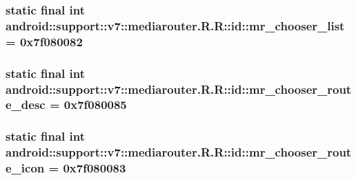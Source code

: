 \hypertarget{classandroid_1_1support_1_1v7_1_1mediarouter_1_1_r_1_1id_77f6fa752dac8bb5734bb79c7aaa6a78}{
\subsubsection[{mr\_\-chooser\_\-list}]{\setlength{\rightskip}{0pt plus 5cm}static final int android::support::v7::mediarouter.R.R::id::mr\_\-chooser\_\-list = 0x7f080082}}
\label{classandroid_1_1support_1_1v7_1_1mediarouter_1_1_r_1_1id_77f6fa752dac8bb5734bb79c7aaa6a78}


\hypertarget{classandroid_1_1support_1_1v7_1_1mediarouter_1_1_r_1_1id_fd0dd5da1b53994a128bd617d711ae46}{
\subsubsection[{mr\_\-chooser\_\-route\_\-desc}]{\setlength{\rightskip}{0pt plus 5cm}static final int android::support::v7::mediarouter.R.R::id::mr\_\-chooser\_\-route\_\-desc = 0x7f080085}}
\label{classandroid_1_1support_1_1v7_1_1mediarouter_1_1_r_1_1id_fd0dd5da1b53994a128bd617d711ae46}


\hypertarget{classandroid_1_1support_1_1v7_1_1mediarouter_1_1_r_1_1id_847b8df29bf2aed513bddd8f388fd0ba}{
\subsubsection[{mr\_\-chooser\_\-route\_\-icon}]{\setlength{\rightskip}{0pt plus 5cm}static final int android::support::v7::mediarouter.R.R::id::mr\_\-chooser\_\-route\_\-icon = 0x7f080083}}
\label{classandroid_1_1support_1_1v7_1_1mediarouter_1_1_r_1_1id_847b8df29bf2aed513bddd8f388fd0ba}



